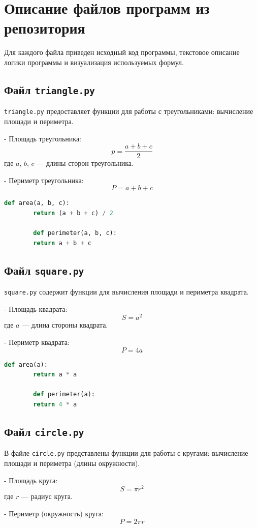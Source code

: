 \documentclass[a4paper, 14pt]{extarticle}
\begin{document}
	\section{Описание файлов программ из репозитория}
	Для каждого файла приведен исходный код программы, текстовое описание логики программы и визуализация используемых формул.
	
	\subsection{Файл \texttt{triangle.py}}
	\texttt{triangle.py} предоставляет функции для работы с треугольниками: вычисление площади и периметра.
	
	- Площадь треугольника:
	\[
	p = \frac{a + b + c}{2}
	\]
	где \( a \), \( b \), \( c \) — длины сторон треугольника.
	
	- Периметр треугольника:
	\[
	P = a + b + c
	\]
	
	\begin{lstlisting}[language=Python]
		def area(a, b, c):
		return (a + b + c) / 2
		
		def perimeter(a, b, c):
		return a + b + c
	\end{lstlisting}
	
	\subsection{Файл \texttt{square.py}}
	\texttt{square.py} содержит функции для вычисления площади и периметра квадрата.
	
	- Площадь квадрата:
	\[ 
	S = a^2 
	\]
	где \( a \) — длина стороны квадрата.
	
	- Периметр квадрата:
	\[ 
	P = 4a 
	\]
	
	\begin{lstlisting}[language=Python]
		def area(a):
		return a * a
		
		def perimeter(a):
		return 4 * a
	\end{lstlisting}
	
	\subsection{Файл \texttt{circle.py}}
	В файле \texttt{circle.py} представлены функции для работы с кругами: вычисление площади и периметра (длины окружности).
	
	- Площадь круга:
	\[ 
	S = \pi r^2 
	\]
	где \( r \) — радиус круга.
	
	- Периметр (окружность) круга:
	\[ 
	P = 2 \pi r 
	\]
	
\end{document}
